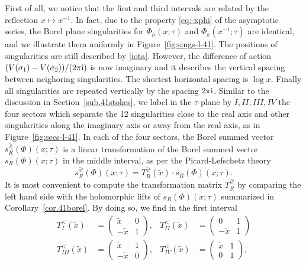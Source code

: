 \documentclass[12pt,reqno]{amsart}
\theoremstyle{definition}
\def\s{\sigma}
\def\tx{\tilde{x}}
\def\-{\,-\,}
\def\ri{\mathrm{i}}
\def\tx{\tilde{x}}
\def\ri{{\rm i}}
\begin{document}
First of all, we notice that the first and third intervals are related
by the reflection $x\mapsto x^{-1}$.  In fact, due to the property
\eqref{eq:-xphi} of the asymptotic series, the Borel plane
singularities for $\Phi_\s(x;\tau)$ and $\Phi_\s(x^{-1};\tau)$ are
identical, and we illustrate them uniformly in
Figure~\ref{fig:sings-l-41}. The positions of singularities are still
described by \eqref{iota}.  However, the difference of action
$(V(\s_1)-V(\s_2))/(2\pi\ri)$ is now imaginary and it describes the
vertical spacing between neighoring singularities.  The shortest
horizontal spacing is $\log x$. Finally all singularities are repeated
vertically by the spacing $2\pi\ri$.  Similar to the discussion in
Section~\ref{sub.41stokes}, we label in the $\tau$-plane by
$I,II,III,IV$ the four sectors which separate the 12 singularities
close to the real axis and other singularities along the imaginary
axis or away from the real axis, as in Figure~\ref{fig:secs-l-41}.  In
each of the four sectors, the Borel summed vector
$s_R^{\gtrless}(\Phi)(x;\tau)$ is a linear transformation of the Borel
summed vector $s_R(\Phi)(x;\tau)$ in the middle interval, as per the
Picard-Lefschetz theory
\begin{equation}
  s_R^{\gtrless}(\Phi)(x;\tau) = T_R^{\gtrless}(\tx)\cdot s_R(\Phi)(x;\tau).
\end{equation}
It is most convenient to compute the transformation matrix
$T_R^{\gtrless}$ by comparing the left hand side with the holomorphic
lifts of $s_R(\Phi)(x;\tau)$ summarized in
Corollary~\ref{cor.41borel}.  By doing so, we find in the first
interval
\begin{align}
  T^{<}_{I}(\tx) &=
    \begin{pmatrix}
      \tx&0\\-\tx&1
    \end{pmatrix}, &
         T^{<}_{II}(\tx) &=
           \begin{pmatrix}
             0&1\\-\tx&1
           \end{pmatrix}\\
  T^{<}_{III}(\tx) &=
    \begin{pmatrix}
      \tx&1\\-\tx&0
    \end{pmatrix}, &
         T^{<}_{IV}(\tx) &=
           \begin{pmatrix}
             \tx&1\\0&1
           \end{pmatrix},
\end{align}
\end{document}
